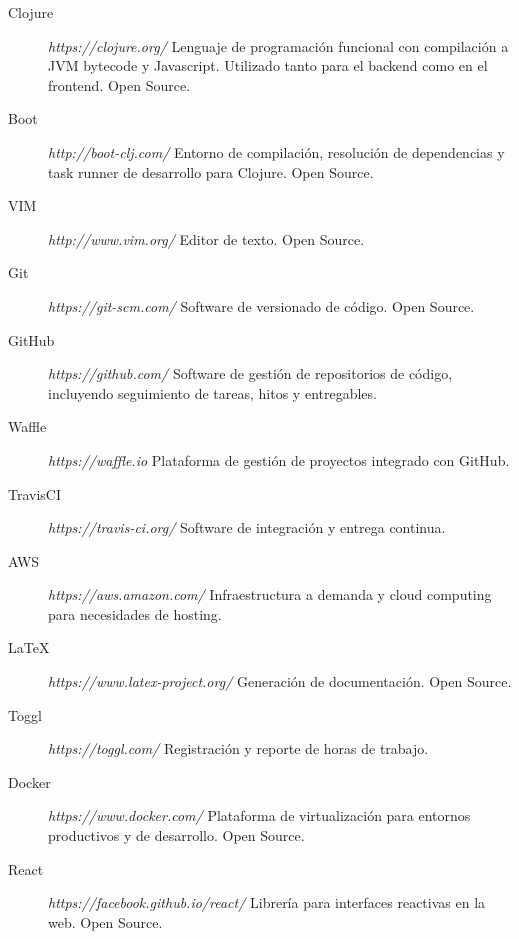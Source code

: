 \documentclass[a4paper,11pt]{article}
\begin{document}
\begin{description}

  \item[Clojure] \textit{https://clojure.org/} Lenguaje de programación
    funcional con compilación a JVM bytecode y Javascript. Utilizado tanto para
    el backend como en el frontend. Open Source.

  \item[Boot] \textit{http://boot-clj.com/} Entorno de compilación, resolución
    de dependencias y task runner de desarrollo para Clojure. Open Source.

  \item[VIM] \textit{http://www.vim.org/} Editor de texto. Open Source.

  \item[Git] \textit{https://git-scm.com/} Software de versionado de código.
    Open Source.

  \item[GitHub] \textit{https://github.com/} Software de gestión de
    repositorios de código, incluyendo seguimiento de tareas, hitos y
    entregables.

  \item[Waffle] \textit{https://waffle.io} Plataforma de gestión de proyectos
    integrado con GitHub.

  \item[TravisCI] \textit{https://travis-ci.org/} Software de integración y
    entrega continua.

  \item[AWS] \textit{https://aws.amazon.com/} Infraestructura a demanda
    y cloud computing para necesidades de hosting.

  \item[LaTeX] \textit{https://www.latex-project.org/} Generación de
    documentación.  Open Source.

  \item[Toggl] \textit{https://toggl.com/} Registración y reporte de horas de
    trabajo.

  \item[Docker] \textit{https://www.docker.com/} Plataforma de virtualización
    para entornos productivos y de desarrollo. Open Source.

  \item[React] \textit{https://facebook.github.io/react/} Librería para
    interfaces reactivas en la web. Open Source.

\end{description}
\end{document}
